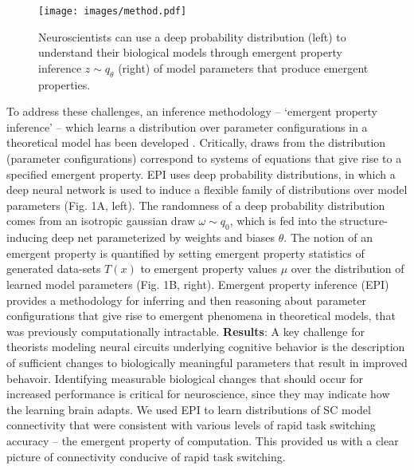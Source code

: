 \documentclass[12pt]{article}
\begin{document}
\begin{figure}[h]
\vspace{0.5cm}
\begin{center}
\texttt{[image: images/method.pdf]}
\end{center}
\caption{Neuroscientists can use a deep probability distribution (left) to understand their biological models through emergent property inference $z \sim q_\theta$ (right) of model parameters that produce emergent properties.}
\vspace{.5cm}
\end{figure}

\noindent To address these challenges, an inference methodology -- `emergent property inference' -- which learns a distribution over parameter configurations in a theoretical model has been developed \cite{bittner2019degenerate}. 
 Critically, draws from the distribution (parameter configurations) correspond to systems of equations that give rise to a specified emergent property.
EPI uses deep probability distributions, in which a deep neural network is used to induce a flexible family of distributions over model parameters (Fig. 1A, left).  
The randomness of a deep probability distribution comes from an isotropic gaussian draw $\omega \sim q_0$, which is fed into the structure-inducing deep net parameterized by weights and biases $\theta$.
The notion of an emergent property is quantified by setting emergent property statistics of generated data-sets $T(x)$ to emergent property values $\mu$ over the distribution of learned model parameters (Fig. 1B, right).
Emergent property inference (EPI) provides a methodology for inferring and then reasoning about parameter configurations that give rise to emergent phenomena in theoretical models, that was previously computationally intractable.
\clearpage
\noindent \textbf{Results}:
A key challenge for theorists modeling neural circuits underlying cognitive behavior is the description of sufficient changes to biologically meaningful parameters that result in improved behavoir.
Identifying measurable biological changes that should occur for increased performance is critical for neuroscience, since they may indicate how the learning brain adapts.  
We used EPI to learn distributions of SC model connectivity that were consistent with various levels of rapid task switching accuracy -- the emergent property of computation.
This provided us with a clear picture of connectivity conducive of rapid task switching. 
\end{document}
